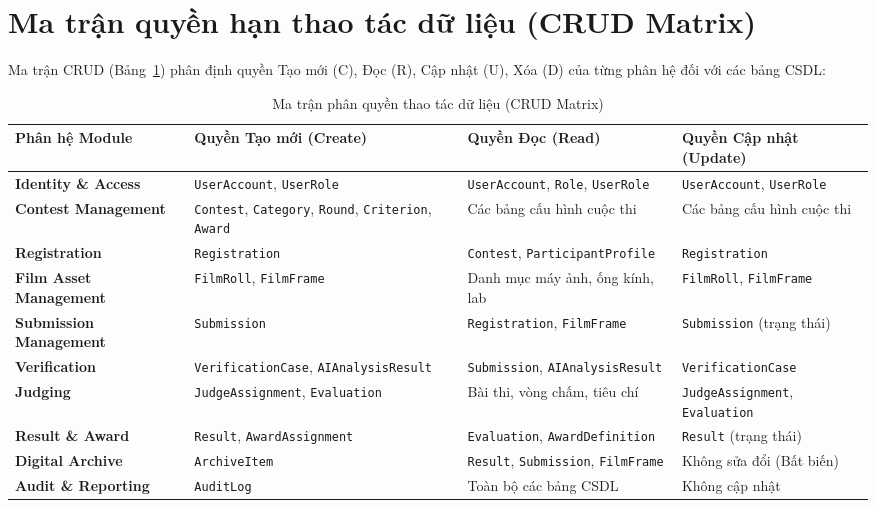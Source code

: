 \section{Ma trận quyền hạn thao tác dữ liệu (CRUD Matrix)}
\label{s:c6_crud}

Ma trận CRUD (Bảng~\ref{tab:c6_crud}) phân định quyền Tạo mới (C), Đọc (R), Cập nhật (U), Xóa (D) của từng phân hệ đối với các bảng CSDL:

\begin{table}[!ht]
\centering
\caption{Ma trận phân quyền thao tác dữ liệu (CRUD Matrix)}
\label{tab:c6_crud}
\scriptsize
\begin{tabularx}{\textwidth}{p{2.8cm}p{3.2cm}p{3.4cm}>{\raggedright\arraybackslash}X}
\toprule
\textbf{Phân hệ Module} & \textbf{Quyền Tạo mới (Create)} & \textbf{Quyền Đọc (Read)} & \textbf{Quyền Cập nhật (Update)} \\
\midrule
\textbf{Identity \& Access} & \texttt{UserAccount}, \texttt{UserRole} & \texttt{UserAccount}, \texttt{Role}, \texttt{UserRole} & \texttt{UserAccount}, \texttt{UserRole} \\
\textbf{Contest Management} & \texttt{Contest}, \texttt{Category}, \texttt{Round}, \texttt{Criterion}, \texttt{Award} & Các bảng cấu hình cuộc thi & Các bảng cấu hình cuộc thi \\
\textbf{Registration} & \texttt{Registration} & \texttt{Contest}, \texttt{ParticipantProfile} & \texttt{Registration} \\
\textbf{Film Asset Management} & \texttt{FilmRoll}, \texttt{FilmFrame} & Danh mục máy ảnh, ống kính, lab & \texttt{FilmRoll}, \texttt{FilmFrame} \\
\textbf{Submission Management} & \texttt{Submission} & \texttt{Registration}, \texttt{FilmFrame} & \texttt{Submission} (trạng thái) \\
\textbf{Verification} & \texttt{VerificationCase}, \texttt{AIAnalysisResult} & \texttt{Submission}, \texttt{AIAnalysisResult} & \texttt{VerificationCase} \\
\textbf{Judging} & \texttt{JudgeAssignment}, \texttt{Evaluation} & Bài thi, vòng chấm, tiêu chí & \texttt{JudgeAssignment}, \texttt{Evaluation} \\
\textbf{Result \& Award} & \texttt{Result}, \texttt{AwardAssignment} & \texttt{Evaluation}, \texttt{AwardDefinition} & \texttt{Result} (trạng thái) \\
\textbf{Digital Archive} & \texttt{ArchiveItem} & \texttt{Result}, \texttt{Submission}, \texttt{FilmFrame} & Không sửa đổi (Bất biến) \\
\textbf{Audit \& Reporting} & \texttt{AuditLog} & Toàn bộ các bảng CSDL & Không cập nhật \\
\bottomrule
\end{tabularx}
\end{table}

